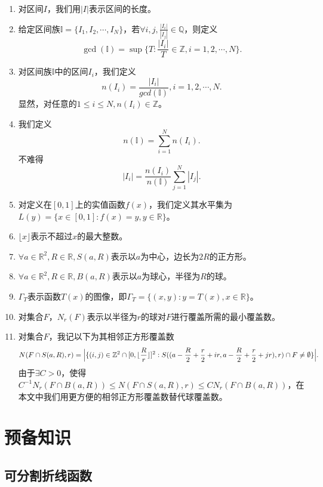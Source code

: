 \begin{enumerate}

      \item 对区间$I$，我们用$|I|$表示区间的长度。
      \item 给定区间族$\mathbb{I}=\{I_1,I_2,\cdots,I_N\}$，若$\forall i,j,\frac{|I_i|}{|I_j|}\in\mathbb{Q}$，则定义
      $$
            \gcd(\mathbb{I})=\sup\big\{T:\frac{|I_i|}{T}\in\mathbb{Z},i=1,2,\cdots,N\big\}.
      $$
      \item 对区间族$\mathbb{I}$中的区间$I_i$，我们定义
      $$
            n(I_i)=\frac{|I_i|}{gcd(\mathbb{I})},i=1,2,\cdots,N.
      $$
      显然，对任意的$1\le i\le N,n(I_i)\in\mathbb{Z}$。
      \item 我们定义
      $$
            n(\mathbb{I})=\sum_{i=1}^Nn(I_i).
      $$
      不难得
      $$
            |I_i|=\frac{n(I_i)}{n(\mathbb{I})}\sum_{j=1}^N|I_j|.
      $$
      \item 对定义在$[0,1]$上的实值函数$f(x)$，我们定义其水平集为$L(y)=\{x\in[0,1]:f(x)=y,y\in\mathbb{R}\}$。
      \item $\lfloor x \rfloor$表示不超过$x$的最大整数。
      \item $\forall a\in\mathbb{R}^2,R\in\mathbb{R},S(a,R)$表示以$a$为中心，边长为$2R$的正方形。
      \item $\forall a\in\mathbb{R}^2,R\in\mathbb{R},B(a,R)$表示以$a$为球心，半径为$R$的球。
      \item $\Gamma_T$表示函数$T(x)$的图像，即$\Gamma_T=\{(x,y):y=T(x),x\in\mathbb{R}\}$。
      \item 对集合$F$，$N_r(F)$表示以半径为$r$的球对$F$进行覆盖所需的最小覆盖数。
      \item 对集合$F$，我记以下为其相邻正方形覆盖数
      $$
            N(F\cap S(a,R),r)=\Big|\{(i,j)\in\mathbb{Z}^2\cap[0,\lfloor\frac{R}{r}\rfloor]^2:\\
                  S((a-\frac{R}{2}+\frac{r}{2}+ir,a-\frac{R}{2}+\frac{r}{2}+jr),r)\cap F\neq\emptyset\}\Big|.
      $$
      由于$\exists C>0$，使得$C^{-1}N_r(F\cap B(a,R))\le N(F\cap S(a,R),r)\le CN_r(F\cap B(a,R))$，在本文中我们用更方便的相邻正方形覆盖数替代球覆盖数。
\end{enumerate}

\section{预备知识}
\subsection{可分割折线函数}

